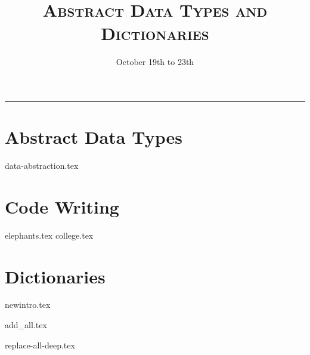 \documentclass{exam}
\title{\textsc{Abstract Data Types and Dictionaries}}
\date{October 19th to 23th}
\begin{document}
\maketitle
\rule{\textwidth}{0.15em}
\fontsize{12}{15}\selectfont


\begin{questions}
\section{Abstract Data Types}
{data-abstraction.tex}
\section{Code Writing}
{elephants.tex}
\newpage
{college.tex}
\newpage
\section{Dictionaries}
{newintro.tex}
\newpage
\vspace{5}

{add_all.tex}

{replace-all-deep.tex}
\end{questions}
\end{document}
